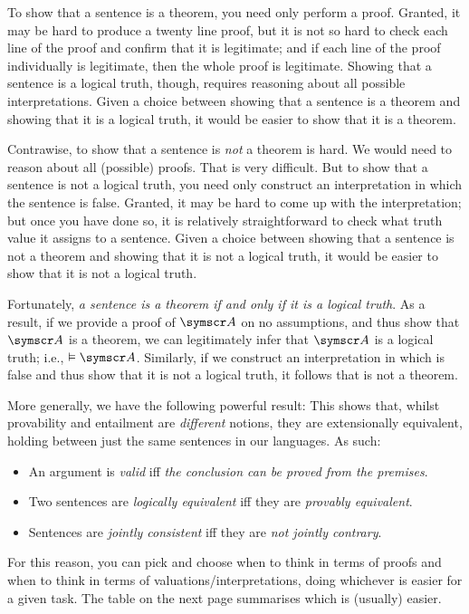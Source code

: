 To show that a sentence is a theorem, you need only perform a proof. Granted, it may be hard to produce a twenty line proof, but it is not so hard to check each line of the proof and confirm that it is legitimate; and if each line of the proof individually is legitimate, then the whole proof is legitimate. Showing that a sentence is a logical truth, though, requires reasoning about all possible interpretations. Given a choice between showing that a sentence is a theorem and showing that it is a logical truth, it would be easier to show that it is a theorem.

Contrawise, to show that a sentence is \emph{not} a theorem is hard. We would need to reason about all (possible) proofs. That is very difficult. But to show that a sentence is not a logical truth, you need only construct an interpretation in which the sentence is false. Granted, it may be hard to come up with the interpretation; but once you have done so, it is relatively straightforward to check what truth value it assigns to a sentence. Given a choice between showing that a sentence is not a theorem and showing that it is not a logical truth, it would be easier to show that it is not a logical truth.

Fortunately, \emph{a sentence is a theorem if and only if it is a logical truth}. As a result, if we provide a proof of $\meta{A}$ on no assumptions, and thus show that $\meta{A}$ is a theorem, we can legitimately infer that $\meta{A}$ is a logical truth; i.e., $\entails\meta{A}$. Similarly, if we construct an interpretation in which  is false and thus show that it is not a logical truth, it follows that  is not a theorem.

More generally, we have the following powerful result:
This shows that, whilst provability and entailment are \emph{different} notions, they are extensionally equivalent, holding between just the same sentences in our languages. As such:
	\begin{itemize}
		\item An argument is \emph{valid} iff \emph{the conclusion can be proved from the premises}.
		\item Two sentences are \emph{logically equivalent} iff they are \emph{provably equivalent}.
		\item Sentences are \emph{jointly consistent} iff they are \emph{not jointly contrary}.
	\end{itemize}
For this reason, you can pick and choose when to think in terms of proofs and when to think in terms of valuations/interpretations, doing whichever is easier for a given task. The table on the next page summarises which is (usually) easier.

